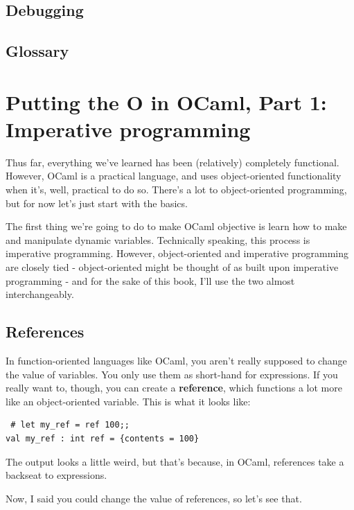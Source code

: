 \documentclass[10pt]{book}
\begin{document}
\section{Debugging}

\section{Glossary}


\chapter{Putting the O in OCaml, Part 1: Imperative programming}

Thus far, everything we've learned has been (relatively) completely functional.
However, OCaml is a practical language, and uses object-oriented functionality 
when it's, well, practical to do so. There's a lot to object-oriented programming,
but for now let's just start with the basics.

The first thing we're going to do to make OCaml objective is learn how to make 
and manipulate dynamic variables. Technically speaking, this process is imperative 
programming. However, object-oriented and imperative programming are closely tied - 
object-oriented might be thought of as built upon imperative programming - and for 
the sake of this book, I'll use the two almost interchangeably.

\section{References}


In function-oriented languages like OCaml, you 
aren't really supposed to change the value of 
variables. You only use them as short-hand for 
expressions. If you really want to, though, you 
can create a {\bf reference}, which functions
a lot more like an object-oriented variable. 
This is what it looks like:

\beforeverb
\begin{verbatim}
 # let my_ref = ref 100;;
val my_ref : int ref = {contents = 100}
\end{verbatim}
\afterverb

The output looks a little weird, but that's because, 
in OCaml, references take a backseat to expressions.

Now, I said you could change the value of references, 
so let's see that.
\end{document}
